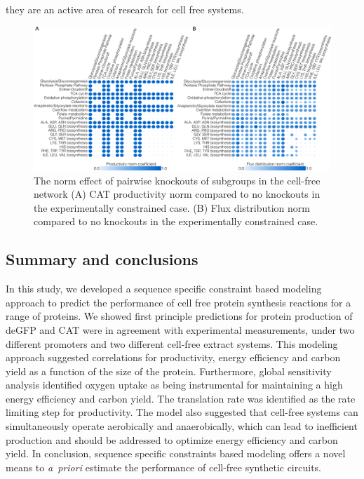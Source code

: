 \documentclass[journal=asbcd6,manuscript=article]{achemso}
\begin{document}
they are an active area of research for cell free systems.
\begin{figure}[t!]
\includegraphics[width=1.0\textwidth]{./figs/Fig-7-FluxDistribition-Analysis.pdf}
\caption{The norm effect of pairwise knockouts of subgroups in the cell-free network (A) CAT productivity norm compared to no knockouts in the experimentally constrained case. (B) Flux distribution norm compared to no knockouts in the experimentally constrained case.}
\label{fig:norm}
\end{figure}


\subsection{Summary and conclusions}
In this study, we developed a sequence specific constraint based modeling approach to predict the performance of cell free protein synthesis reactions for a range of proteins. We showed first principle predictions for protein production of deGFP and CAT were in agreement with experimental measurements, under two different promoters and two different cell-free extract systems.
This modeling approach suggested correlations for productivity, energy efficiency and carbon yield as a function of the size of the protein.
Furthermore, global sensitivity analysis identified oxygen uptake as being instrumental for maintaining a high energy efficiency and carbon yield.
The translation rate was identified as the rate limiting step for productivity.
The model also suggested that cell-free systems can simultaneously operate aerobically and anaerobically, which can lead to inefficient production and should be addressed to optimize energy efficiency and carbon yield.
In conclusion, sequence specific constraints based modeling offers a novel means to \emph{a~priori} estimate the performance of cell-free synthetic circuits.

\clearpage
\end{document}

